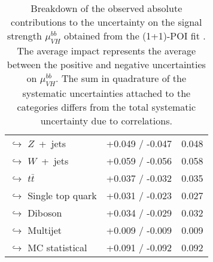 \begin{table}[tbp]
\begin{center}
\begin{tabular}{ l | l  c c }
        \multicolumn{2}{l}{$\hookrightarrow$ $Z$~+~jets} & +0.049 / -0.047  & 0.048 \\
        \multicolumn{2}{l}{$\hookrightarrow$ $W$~+~jets} & +0.059 / -0.056  & 0.058 \\
        \multicolumn{2}{l}{$\hookrightarrow$ $t\bar{t}$} & +0.037 / -0.032  & 0.035 \\
        \multicolumn{2}{l}{$\hookrightarrow$ Single top quark} & +0.031 / -0.023  & 0.027 \\
        \multicolumn{2}{l}{$\hookrightarrow$ Diboson} & +0.034 / -0.029  & 0.032 \\
        \multicolumn{2}{l}{$\hookrightarrow$ Multijet} & +0.009 / -0.009  & 0.009 \\
        \multicolumn{2}{l}{$\hookrightarrow$ MC statistical} & +0.091 / -0.092  & 0.092 \\        
        \hline\bottomrule
    \end{tabular}
    \end{center}
    \caption{
        Breakdown of the observed absolute contributions to the uncertainty on the signal strength $\mu_{VH}^{bb}$ obtained from the (1+1)-POI fit \cite{Dao:2688371}. 
        The average impact represents the average between the positive and negative uncertainties on $\mu_{VH}^{bb}$.
        The sum in quadrature of the systematic uncertainties attached to the categories differs from the total systematic uncertainty due to correlations. 
    }
    \label{tab:mu_syst_unc}
\end{table}
    